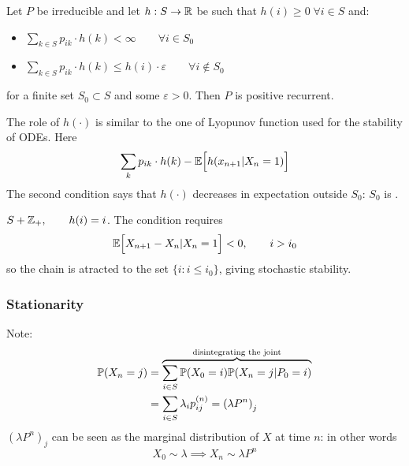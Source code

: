 \documentclass{article}
\begin{document}
\begin{proposition}
    Let $P$ be irreducible and let $h:S\rightarrow\mathbb{R}$ be such that $h(i)\geqslant0 \;\forall i \in S$ and:
    \begin{itemize}
        \item $\sum_{k\in S} p_{ik} \cdot h(k)<\infty\qquad\forall i \in S_0$
        \item $\sum_{k\in S} p_{ik} \cdot h(k)\leqslant h(i)\cdot \varepsilon\qquad\forall i \notin S_0$
    \end{itemize}
    for a finite set $S_0 \subset S$ and some $\varepsilon>0$. Then $P$ is positive recurrent.
\end{proposition}
The role of $h(\cdot)$ is similar to the one of Lyopunov function used for the stability of ODEs. Here
\[\sum_{k} p_{ik} \cdot h(k)-\mathbb{E}\Bigl[{h(x_{n+1}|X_n=1)}\Bigr]\]
The second condition says that $h(\cdot)$ decreases in expectation outside $S_0$: $S_0$ is .
\begin{example}
    $S+\mathbb{Z}_+, \qquad h(i)=i$. The condition requires
    \[\mathbb{E}\Bigl[{X_{n+1}-X_{n}|X_n=1}\Bigr]<0, \qquad i>i_0\]
    so the chain is atracted to the set $\{i:i\leqslant i_0\}$, giving stochastic stability.
\end{example}
\subsubsection{Stationarity}
Note:
\begin{align*}
    \prob(X_n=j) &= \overbrace{\sum_{i\in S}\prob(X_0=i)\prob(X_n=j|P_0=i) }^{\mathclap{\text{disintegrating the joint}}}\\
    &=\sum_{i\in S}\lambda_i p_{ij}^{(n)}=\left(\lambda P^n\right)_j
\end{align*}
$\left(\lambda P^n\right)_j$ can be seen as the marginal distribution of $X$ at time $n$: in other words
\[X_0\sim \lambda\implies X_n\sim\lambda P^n\]
\end{document}
